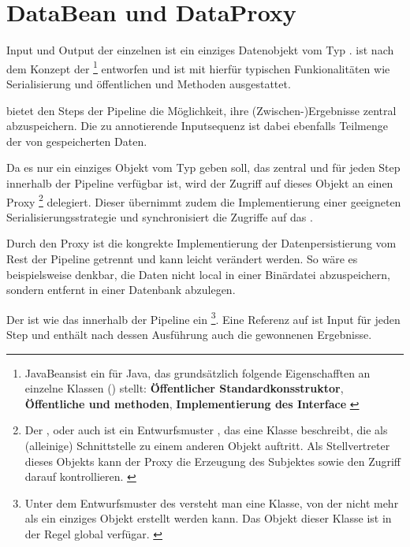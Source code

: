 \section{DataBean und DataProxy} \label{chp:data}
Input und Output der einzelnen  ist ein einziges
Datenobjekt vom Typ . 
 ist nach dem Konzept der 
\footnote{
JavaBeans\texttrademark ist ein   für
Java, das grundsätzlich folgende Eigenschafften an einzelne Klassen
() stellt: \textbf{Öffentlicher Standardkonsstruktor},
\textbf{Öffentliche  und  methoden},
\textbf{Implementierung des  Interface}
\citep{beans_1997}
}
entworfen und ist mit hierfür typischen Funkionalitäten wie Serialisierung und
öffentlichen   und  Methoden ausgestattet.

 bietet den Steps der Pipeline die Möglichkeit, ihre
(Zwischen-)Ergebnisse zentral abzuspeichern.
Die zu annotierende Inputsequenz ist dabei ebenfalls Teilmenge der
von  gespeicherten Daten.

Da es nur ein einziges Objekt vom Typ  geben soll, das zentral
und für jeden Step innerhalb der Pipeline verfügbar ist, wird der Zugriff auf
dieses Objekt an einen Proxy
\footnote{
Der , oder auch  ist ein Entwurfsmuster
, das eine Klasse beschreibt, die als (alleinige)
Schnittstelle zu einem anderen Objekt auftritt.
Als Stellvertreter dieses Objekts kann der Proxy die Erzeugung des Subjektes
sowie den Zugriff darauf kontrollieren.
\citep{freeman_entwursmuster_2005, gamma_entwurfsmuster:_2009}
}
delegiert. Dieser übernimmt zudem die Implementierung einer geeigneten
Serialisierungsstrategie und synchronisiert die Zugriffe auf das
.

Durch den Proxy ist die kongrekte Implementierung der Datenpersistierung vom
Rest der Pipeline getrennt und kann leicht verändert werden.
So wäre es beispielsweise denkbar, die Daten nicht local in einer Binärdatei
abzuspeichern, sondern entfernt in einer Datenbank abzulegen.

Der  ist wie das  innerhalb der Pipeline ein
\footnote{Unter dem Entwurfsmuster  des
 versteht man eine Klasse, von der nicht mehr als ein einziges
Objekt erstellt werden kann.
Das Objekt dieser Klasse ist in der Regel global verfügar.
\citep{freeman_entwursmuster_2005, gamma_entwurfsmuster:_2009}
}.
Eine Referenz auf  ist Input für jeden Step und enthält nach
dessen Ausführung auch die gewonnenen Ergebnisse.

